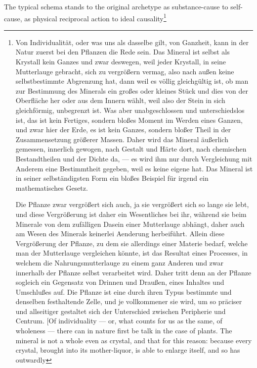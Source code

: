 \documentclass[12pt,a4paper]{book}
\begin{document}
The typical schema stands to the original archetype as substance-cause to
self-cause, as physical reciprocal action to ideal
causality\footnote{Von Individualität, oder was uns als dasselbe gilt,
von Ganzheit, kann in der Natur zuerst bei den Pflanzen die Rede sein.
Das Mineral ist selbst als Krystall kein Ganzes und zwar deswegen, weil
jeder Krystall, in seine Mutterlauge gebracht, sich zu vergrößern
vermag, also nach außen keine selbstbestimmte Abgrenzung hat, dann weil
es völlig gleichgültig ist, ob man zur Bestimmung des Minerals ein großes
oder kleines Stück und dies von der Oberfläche her oder aus dem Innern
wählt, weil also der Stein in sich gleichförmig, unbegrenzt ist. Was
aber unabgeschlossen und unterschiedslos ist, das ist kein Fertiges,
sondern bloßes Moment im Werden eines Ganzen, und zwar hier der Erde, es
ist kein Ganzes, sondern bloßer Theil in der Zusammensetzung größerer
Massen. Daher wird das Mineral äußerlich gemessen, innerlich gewogen,
nach Gestalt und Härte dort, nach chemischen Bestandtheilen und der
Dichte da, --- es wird ihm nur durch Vergleichung mit Anderem eine
Bestimmtheit gegeben, weil es keine eigene hat. Das Mineral ist in
seiner selbständigsten Form ein bloßes Beispiel für irgend ein
mathematisches Gesetz.
\par Die Pflanze zwar vergrößert sich auch, ja sie vergrößert sich so
lange sie lebt, und diese Vergrößerung ist daher ein Wesentliches bei
ihr, während sie beim Minerale von dem zufälligen Dasein einer
Mutterlauge abhängt, daher auch am Wesen des Minerals keinerlei Aenderung
herbeiführt. Allein diese Vergrößerung der Pflanze, zu dem sie
allerdings einer Materie bedarf, welche man der Mutterlauge vergleichen
könnte, ist das Resultat eines Processes, in welchem die
Nahrungsmutterlauge zu einem ganz Anderen und zwar innerhalb der Pflanze
selbst verarbeitet wird. Daher tritt denn an der Pflanze sogleich ein
Gegensatz von Drinnen und Draußen, eines Inhaltes und Umschlußes auf.
Die Pflanze ist eine durch ihren Typus bestimmte und denselben
festhaltende Zelle, und je vollkommener sie wird, um so präciser und
allseitiger gestaltet sich der Unterschied zwischen Peripherie und
Centrum. [Of individuality --- or, what counts for us as the same, of wholeness
--- there can in nature first be talk in the case of plants. The mineral is not
a whole even as crystal, and that for this reason: because every crystal,
brought into its mother-liquor, is able to enlarge itself, and so has outwardly
}
\end{document}
